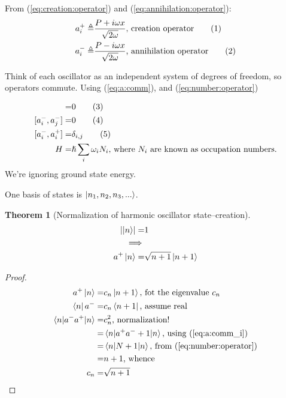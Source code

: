 \documentclass[]{article}
\newcommand\numberthis{\addtocounter{equation}{1}\tag{\theequation}}
\newtheorem{thm}{Theorem}
\begin{document}
From (\ref{eq:creation:operator}) and (\ref{eq:annihilation:operator}):
\begin{align*}
a^+_i \triangleq & \frac{P + i \omega x } {\sqrt{2 \omega}} \text{, creation operator} \numberthis \label{eq:creation:operator:i}\\
a^-_i \triangleq & \frac{P - i \omega x } {\sqrt{2 \omega}}\text{, annihilation operator} \numberthis \label{eq:annihilation:operator_i}\\
\end{align*}

Think of each oscillator  as an independent system of degrees of freedom, so operators commute. Using  (\ref{eq:a:comm}), and (\ref{eq:number:operator})

\begin{align*}
[a^+_i,a^+_j] =& 0 \numberthis \label{eq:a:comm_i_plus}\\
[a^-_i,a^-_j] =& 0 \numberthis \label{eq:a:comm_i_minus}\\
[a^-_i,a^+_i] =& \delta_{i,j} \numberthis \label{eq:a:comm_i}\\
H =& \hslash \sum_{i}  \omega_i N_i\text{, where $N_i$ are known as occupation numbers.}
\end{align*}
We're ignoring ground state energy.

One basis of states is $\ket{n_1,n_2,n_3,...}$.

\begin{thm}[Normalization of harmonic oscillator state--creation]\label{thm:norm:harmonic}
	\begin{align*}
	\left|\ket{n}\right|=&1\\
	\implies&\\
	a^+\ket{n}=&\sqrt{n+1}\ket{n+1}
	\end{align*}
\end{thm} 

\begin{proof}
	\begin{align*}
	a^+\ket{n}=&c_n\ket{n+1} \text{, fot the eigenvalue $c_n$}\\
	\bra{n}a^-=&c_n\bra{n+1}\text{, assume real}\\
	\braket{n|a^-a^+|n}=&c_n^2\text{, normalization!}\\
	=& \braket{n|a^+a^-+1|n}\text{, using (\ref{eq:a:comm_i})}\\
	=& \braket{n|N+1|n} \text{, from (\ref{eq:number:operator})}\\
	=&n+1 \text{, whence}\\
	c_n=&\sqrt{n+1}
	\end{align*}
\end{proof}
\end{document}
